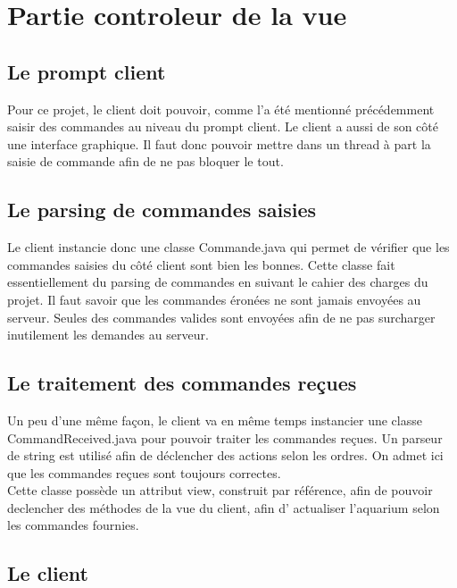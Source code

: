 \section{Partie controleur de la vue}

\subsection{Le prompt client}

\indent Pour ce projet, le client doit pouvoir, comme l'a été mentionné précédemment saisir des commandes au niveau du prompt client.
Le client a aussi de son côté une interface graphique.
Il faut donc pouvoir mettre dans un thread à part la saisie de commande afin de ne pas bloquer le tout.

\subsection{Le parsing de commandes saisies}

\indent Le client instancie donc une classe Commande.java qui permet de vérifier que les commandes
saisies du côté client sont bien les bonnes. Cette classe fait essentiellement du parsing de commandes
en suivant le cahier des charges du projet. Il faut savoir que les commandes éronées ne sont jamais envoyées au serveur. Seules des commandes
valides sont envoyées afin de ne pas surcharger inutilement les demandes au serveur.

\subsection{Le traitement des commandes reçues}

\indent Un peu d'une même façon, le client va en même temps instancier une classe CommandReceived.java
pour pouvoir traiter les commandes reçues. Un parseur de string est utilisé afin de déclencher des actions selon les ordres. On admet
ici que les commandes reçues sont toujours correctes.\\
Cette classe possède un attribut view, construit par référence, afin de pouvoir declencher des méthodes de la vue du client, afin d' actualiser
l'aquarium selon les commandes fournies.

\subsection{Le client}

